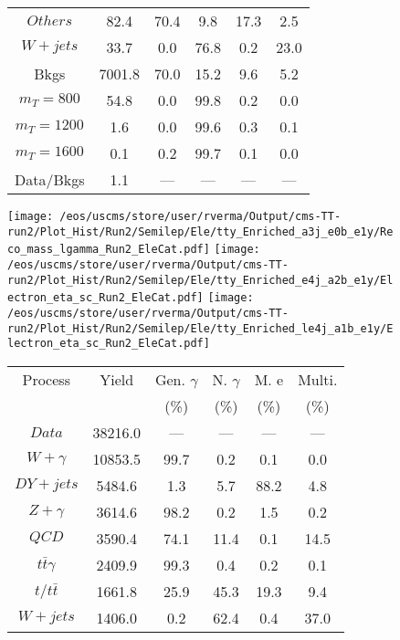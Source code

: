 \begin{figure}
\begin{minipage}[c]{0.32\textwidth}
{\begin{tabular}{cccccc}
$ Others $ &  82.4 &  70.4 &  9.8 &  17.3 &  2.5\\
$ W+jets $ &  33.7 &  0.0 &  76.8 &  0.2 &  23.0\\
Bkgs &  7001.8 &  70.0 &  15.2 &  9.6 &  5.2\\
$ m_{T} = 800 $ &  54.8 &  0.0 &  99.8 &  0.2 &  0.0\\
$ m_{T} = 1200 $ &  1.6 &  0.0 &  99.6 &  0.3 &  0.1\\
$ m_{T} = 1600 $ &  0.1 &  0.2 &  99.7 &  0.1 &  0.0\\
Data/Bkgs &  1.1 &  --- &  --- &  --- &  ---\\
\hline
\end{tabular}
}
\end{minipage}
\end{figure}

\begin{figure}
\centering
\texttt{[image: /eos/uscms/store/user/rverma/Output/cms-TT-run2/Plot\_Hist/Run2/Semilep/Ele/tty\_Enriched\_a3j\_e0b\_e1y/Reco\_mass\_lgamma\_Run2\_EleCat.pdf]}
\texttt{[image: /eos/uscms/store/user/rverma/Output/cms-TT-run2/Plot\_Hist/Run2/Semilep/Ele/tty\_Enriched\_e4j\_a2b\_e1y/Electron\_eta\_sc\_Run2\_EleCat.pdf]}
\texttt{[image: /eos/uscms/store/user/rverma/Output/cms-TT-run2/Plot\_Hist/Run2/Semilep/Ele/tty\_Enriched\_le4j\_a1b\_e1y/Electron\_eta\_sc\_Run2\_EleCat.pdf]}
\begin{minipage}[c]{0.32\textwidth}
\centering
\tiny{
\begin{tabular}{cccccc}
\hline
Process & Yield & Gen. $\gamma$ & N. $\gamma$ & M. e & Multi. \\
 &  & (\%) & (\%) & (\%) & (\%)  \\
\hline
                                                                      $ Data $ &  38216.0 &  --- &  --- &  --- &  ---\\
$ W+\gamma $ &  10853.5 &  99.7 &  0.2 &  0.1 &  0.0\\
$ DY+jets $ &  5484.6 &  1.3 &  5.7 &  88.2 &  4.8\\
$ Z+\gamma $ &  3614.6 &  98.2 &  0.2 &  1.5 &  0.2\\
$ QCD $ &  3590.4 &  74.1 &  11.4 &  0.1 &  14.5\\
$ t\bar{t}\gamma $ &  2409.9 &  99.3 &  0.4 &  0.2 &  0.1\\
$ t/t\bar{t} $ &  1661.8 &  25.9 &  45.3 &  19.3 &  9.4\\
$ W+jets $ &  1406.0 &  0.2 &  62.4 &  0.4 &  37.0\\

\end{tabular}}
\end{minipage}
\end{figure}
